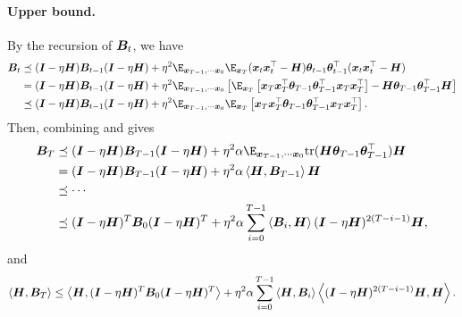 \begin{enumerate}[leftmargin=*]
        \paragraph{Upper bound.} 
        
        By the recursion of ${\bm{B}}_t$, we have
        \begin{align*}
            \mB_t &\preceq (\mI-\eta\mH)\mB_{t-1}(\mI-\eta\mH)+\eta^2\E_{\vx_{T-1},\cdots\vx_0}\E_{\vx_{T}}(\vx_{t}\vx_{t}^{\top}-\mH)\vtheta_{t-1}\vtheta_{t-1}^{\top}(\vx_{t}\vx_{t}^{\top}-\mH)\\
            &= (\mI-\eta\mH)\mB_{t-1}(\mI-\eta\mH)+\eta^2\E_{\vx_{T-1},\cdots\vx_0}\left[\E_{\vx_T}\left[\vx_T\vx_T^\top\vtheta_{T-1}\vtheta_{T-1}^\top \vx_T\vx_T^\top\right]- \mH \vtheta_{T-1}\vtheta_{T-1}^\top \mH\right]\\
            &\preceq (\mI-\eta\mH)\mB_{t-1}(\mI-\eta\mH)+\eta^2\E_{\vx_{T-1},\cdots\vx_0}\E_{\vx_T}\left[\vx_T\vx_T^\top\vtheta_{T-1}\vtheta_{T-1}^\top \vx_T\vx_T^\top\right].
        \end{align*}
        Then, combining  and  gives
        \begin{align*}
            \mB_T&\preceq(\mI-\eta\mH)\mB_{T-1}(\mI-\eta\mH)+\eta^2\alpha\E_{\vx_{T-1},\cdots\vx_0}\text{tr} (\mH\vtheta_{T-1}\vtheta_{T-1}^{\top})\mH \\
            &=(\mI-\eta\mH)\mB_{T-1}(\mI-\eta\mH)+\eta^2\alpha\inp{\mH}{\mB_{T-1}}\mH \\
            &\preceq \cdots \\
            &\preceq (\mI-\eta\mH)^{T}\mB_0(\mI-\eta\mH)^{T}+\eta^2\alpha\sum_{i=0}^{T-1}\inp{\mB_i}{\mH}(\mI-\eta\mH)^{2(T-i-1)}\mH,
        \end{align*}
        and 
        \[\left\langle {\bm{H}},{\bm{B}}_T\right\rangle\leq\left\langle {\bm{H}},({\bm{I}}-\eta{\bm{H}})^{T}{\bm{B}}_0({\bm{I}}-\eta{\bm{H}})^{T}\right\rangle+\eta^2\alpha\sum_{i=0}^{T-1}\left\langle {\bm{H}},{\bm{B}}_i\right\rangle\left\langle ({\bm{I}}-\eta{\bm{H}})^{2(T-i-1)}{\bm{H}},{\bm{H}}\right\rangle.\]
        

\end{enumerate}
